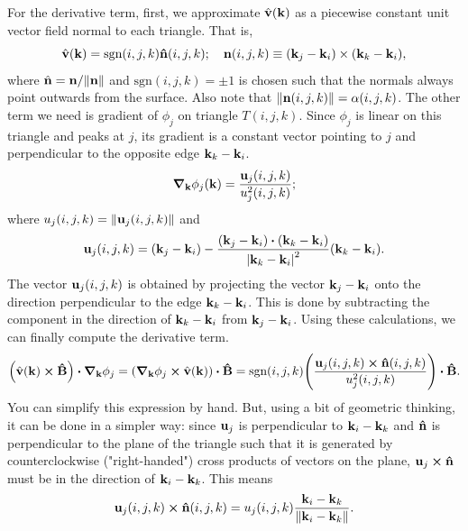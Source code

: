 \documentclass[12pt]{article}
\begin{document}
For the derivative term, first, we approximate $\hat{\vb{v}}(\vb{k})$ as a piecewise constant
unit vector field normal to each triangle. That is,
\begin{equation}
\hat{\vb{v}}(\vb{k}) = \text{sgn}(i,j,k) \vu{n}(i,j,k); \quad
\vb{n}(i,j,k) \equiv (\vb{k}_j - \vb{k}_i) \times (\vb{k}_k - \vb{k}_i),
\end{equation}
where $\hat{\vb{n}} = \vb{n}/\norm{\vb{n}}$ and $\text{sgn}(i,j,k) = \pm1$ is chosen such that
the normals always point outwards from the surface.
Also note that $\norm{\vb{n}(i,j,k)} = \alpha(i,j,k)$. The other term we need is gradient of
$\phi_j$ on triangle $T(i,j,k)$. Since $\phi_j$ is linear on this triangle and peaks at $j$,
its gradient is a constant vector pointing to $j$ and perpendicular to the opposite edge
$\vb{k}_k - \vb{k}_i$.
\begin{equation}
\grad_{\vb{k}} \phi_j(\vb{k}) = \frac{\vb{u}_j(i,j,k)}{u^2_j(i,j,k)};
\end{equation}
where $u_j(i,j,k) = \norm{\vb{u}_j(i,j,k)}$ and
\begin{equation}
\vb{u}_j(i,j,k) = (\vb{k}_j - \vb{k}_i)
- \frac{(\vb{k}_j-\vb{k}_i)\vdot(\vb{k}_k-\vb{k}_i)}{\abs{\vb{k}_k - \vb{k}_i}^2}
(\vb{k}_k - \vb{k}_i).
\end{equation}
The vector $\vb{u}_j(i,j,k)$ is obtained by projecting the vector $\vb{k}_j - \vb{k}_i$ onto the
direction perpendicular to the edge $\vb{k}_k - \vb{k}_i$. This is done by subtracting the component
in the direction of $\vb{k}_k - \vb{k}_i$ from $\vb{k}_j - \vb{k}_i$. Using these calculations, we
can finally compute the derivative term.
\begin{equation}
    \qty(\hat{\vb{v}}(\vb{k})\cross\vu{B})\vdot\grad_{\vb{k}}\phi_j
    = \qty(\grad_{\vb{k}}\phi_j\cross\hat{\vb{v}}(\vb{k}))\vdot\vu{B}
    = \text{sgn}(i,j,k)\qty(\frac{\vb{u}_j(i,j,k)\cross\vu{n}(i,j,k)}{u^2_j(i,j,k)})\vdot\vu{B}.
\end{equation}
You can simplify this expression by hand. But, using a bit of geometric thinking, it can be done
in a simpler way: since $\vb{u}_j$ is perpendicular to $\vb{k}_i - \vb{k}_k$ and $\vu{n}$ is
perpendicular to the plane of the triangle such that it is generated by counterclockwise
("right-handed") cross products of vectors on the plane, $\vb{u}_j\cross\vu{n}$ must be in the
direction of $\vb{k}_i - \vb{k}_k$. This means
\begin{equation}
    \vb{u}_j(i,j,k)\cross\vu{n}(i,j,k) = u_j(i,j,k)
    \frac{\vb{k}_i-\vb{k}_k}{\norm{\vb{k}_i-\vb{k}_k}}.
\end{equation}
\end{document}
